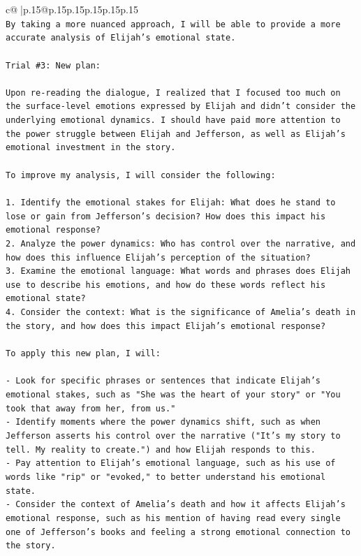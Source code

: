 \documentclass{article}
\begin{document}
{\begin{supertabular}{c@{$\;$}|p{.15\linewidth}@{}p{.15\linewidth}p{.15\linewidth}p{.15\linewidth}p{.15\linewidth}p{.15\linewidth}}
{{{\\ 
\texttt{By taking a more nuanced approach, I will be able to provide a more accurate analysis of Elijah's emotional state.} \\
\\ 
\texttt{Trial \#3: New plan: } \\
\\ 
\texttt{Upon re{-}reading the dialogue, I realized that I focused too much on the surface{-}level emotions expressed by Elijah and didn't consider the underlying emotional dynamics. I should have paid more attention to the power struggle between Elijah and Jefferson, as well as Elijah's emotional investment in the story. } \\
\\ 
\texttt{To improve my analysis, I will consider the following:} \\
\\ 
\texttt{1. Identify the emotional stakes for Elijah: What does he stand to lose or gain from Jefferson's decision? How does this impact his emotional response?} \\
\texttt{2. Analyze the power dynamics: Who has control over the narrative, and how does this influence Elijah's perception of the situation?} \\
\texttt{3. Examine the emotional language: What words and phrases does Elijah use to describe his emotions, and how do these words reflect his emotional state?} \\
\texttt{4. Consider the context: What is the significance of Amelia's death in the story, and how does this impact Elijah's emotional response?} \\
\\ 
\texttt{To apply this new plan, I will:} \\
\\ 
\texttt{{-} Look for specific phrases or sentences that indicate Elijah's emotional stakes, such as "She was the heart of your story" or "You took that away from her, from us."} \\
\texttt{{-} Identify moments where the power dynamics shift, such as when Jefferson asserts his control over the narrative ("It's my story to tell. My reality to create.") and how Elijah responds to this.} \\
\texttt{{-} Pay attention to Elijah's emotional language, such as his use of words like "rip" or "evoked," to better understand his emotional state.} \\
\texttt{{-} Consider the context of Amelia's death and how it affects Elijah's emotional response, such as his mention of having read every single one of Jefferson's books and feeling a strong emotional connection to the story.} \\
}}}
\end{supertabular}}
\end{document}

